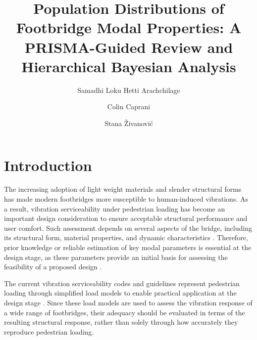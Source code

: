 \documentclass[preprint,a4paper,12pt]{elsarticle}
\begin{document}
\begin{frontmatter}

\title{Population Distributions of Footbridge Modal Properties: A PRISMA-Guided Review and Hierarchical Bayesian Analysis}

\author[inst1]{Samadhi Loku Hetti Arachchilage}
\author[inst1]{Colin Caprani}
\author[inst2]{Stana Živanović}




\begin{abstract}

\end{abstract}

\begin{keyword}
\end{keyword}

\end{frontmatter}

\section{Introduction}

The increasing adoption of light weight materials and slender structural forms has made modern footbridges more susceptible to human-induced vibrations. 
As a result, vibration serviceability under pedestrian loading has become an important design consideration to ensure acceptable structural performance and user comfort.
Such assessment depends on several aspects of the bridge, including its structural form, material properties, and dynamic characteristics \cite{ahmadi2018framework,ahmadi2019assessment,ahmadi2021experimental}. 
Therefore, prior knowledge or reliable estimation of key modal parameters is essential at the design stage, as these parameters provide an initial basis for assessing the feasibility of a proposed design \cite{vzivanovic2007finite,van2014vibration,tadeu2022vibration,reynolds2025operational}.

The current vibration serviceability codes and guidelines represent pedestrian loading through simplified load models to enable practical application at the design stage \cite{BSI2008NAEN1991,EN1991_2_2023,JGJT441_2019,CJJ69_2017_draft,FIB2005Footbridges,setra2006,feldman2008hivoss}.
Since these load models are used to assess the vibration response of a wide range of footbridges, their adequacy should be evaluated in terms of the resulting structural response, rather than solely through how accurately they reproduce pedestrian loading.
\end{document}
